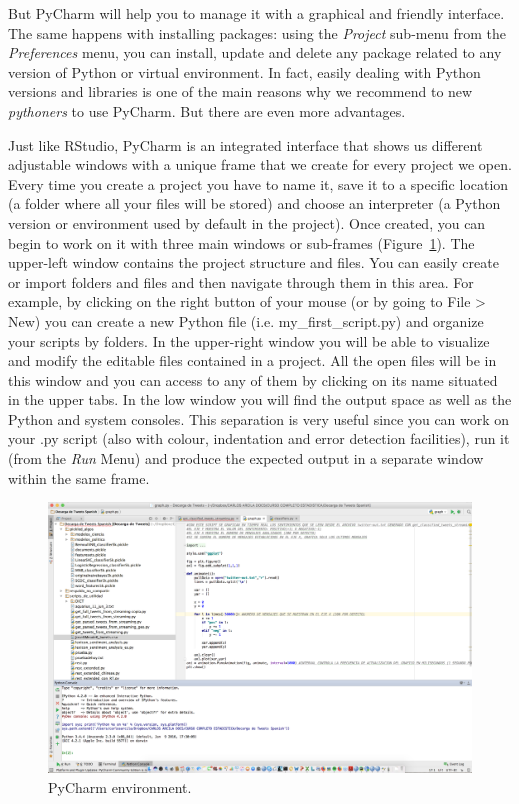 But PyCharm will help you to manage it with a graphical and friendly
interface. The same happens with installing packages: using the
\emph{Project} sub-menu from the \emph{Preferences} menu, you can
install, update and delete any package related to any version of
Python or virtual environment. In fact, easily dealing with Python
versions and libraries is one of the main reasons why we recommend to
new \emph{pythoners} to use PyCharm. But there are even more
advantages.

Just like RStudio, PyCharm is an integrated interface that shows us
different adjustable windows with a unique frame that we create for
every project we open. Every time you create a project you have to
name it, save it to a specific location (a folder where all your files
will be stored) and choose an interpreter (a Python version or
environment used by default in the project). Once created, you can
begin to work on it with three main windows or sub-frames
(Figure~\ref{fig:pycharm}). The upper-left window contains the project
structure and files. You can easily create or import folders and files
and then navigate through them in this area. For example, by clicking
on the right button of your mouse (or by going to File \textgreater
New) you can create a new Python file (i.e. my\_first\_script.py) and
organize your scripts by folders. In the upper-right window you will
be able to visualize and modify the editable files contained in a
project. All the open files will be in this window and you can access
to any of them by clicking on its name situated in the upper tabs. In
the low window you will find the output space as well as the Python
and system consoles. This separation is very useful since you can work
on your .py script (also with colour, indentation and error detection
facilities), run it (from the \emph{Run} Menu) and produce the
expected output in a separate window within the same frame.

\begin{figure}
\centering
\includegraphics[width=0.9\linewidth]{figures/ch3_pycharm}
\caption{PyCharm environment.}
\label{fig:pycharm}
\end{figure}

